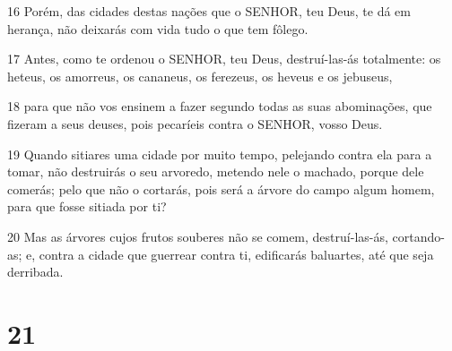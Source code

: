 \par 16 Porém, das cidades destas nações que o SENHOR, teu Deus, te dá em herança, não deixarás com vida tudo o que tem fôlego.
\par 17 Antes, como te ordenou o SENHOR, teu Deus, destruí-las-ás totalmente: os heteus, os amorreus, os cananeus, os ferezeus, os heveus e os jebuseus,
\par 18 para que não vos ensinem a fazer segundo todas as suas abominações, que fizeram a seus deuses, pois pecaríeis contra o SENHOR, vosso Deus.
\par 19 Quando sitiares uma cidade por muito tempo, pelejando contra ela para a tomar, não destruirás o seu arvoredo, metendo nele o machado, porque dele comerás; pelo que não o cortarás, pois será a árvore do campo algum homem, para que fosse sitiada por ti?
\par 20 Mas as árvores cujos frutos souberes não se comem, destruí-las-ás, cortando-as; e, contra a cidade que guerrear contra ti, edificarás baluartes, até que seja derribada.

\chapter{21}

